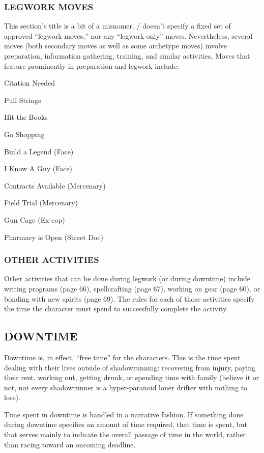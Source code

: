 \documentclass[oneside,10pt]{article}
\begin{document}
\begin{multicols}{2}
  \subsubsection{LEGWORK MOVES}
  This section’s title is a bit of a misnomer. \SW/ doesn’t specify a
  fixed set of approved ``legwork moves,'' nor any ``legwork only''
  moves. Nevertheless, several moves (both secondary moves as well as
  some archetype moves) involve preparation, information gathering,
  training, and similar activities, Moves that feature prominently in
  preparation and legwork include:
  \begin{dent}
    \tcirc{} Citation Needed

    \tcirc{} Pull Strings

    \tcirc{} Hit the Books

    \tcirc{} Go Shopping

    \tcirc{} Build a Legend (Face)

    \tcirc{} I Know A Guy (Face)

    \tcirc{} Contracts Available (Mercenary)

    \tcirc{} Field Trial (Mercenary)

    \tcirc{} Gun Cage (Ex-cop)

    \tcirc{} Pharmacy is Open (Street Doc)
  \end{dent}

  \subsubsection{OTHER ACTIVITIES}
  Other activities that can be done during legwork (or during
  downtime) include writing programs (page 66), spellcrafting (page
  67), working on gear (page 60), or bonding with new spirits (page
  69). The rules for each of those activities specify the time the
  character must spend to successfully complete the activity.

  \subsection{DOWNTIME}
  Downtime is, in effect, ``free time'' for the characters. This is
  the time spent dealing with their lives outside of shadowrunning:
  recovering from injury, paying their rent, working out, getting
  drunk, or spending time with family (believe it or not, not every
  shadowrunner is a hyper-paranoid loner drifter with nothing to lose).

  Time spent in downtime is handled in a narrative fashion.  If
  something done during downtime specifies an amount of time required,
  that time is spent, but that serves mainly to indicate the overall
  passage of time in the world, rather than racing toward an oncoming
  deadline.


\end{multicols}
\end{document}
